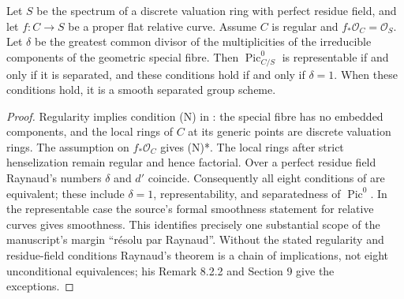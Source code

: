 \begin{theorem}\label{thm:B3-picard}
Let $S$ be the spectrum of a discrete valuation ring with perfect
residue field, and let $f:C\to S$ be a proper flat relative curve.
Assume $C$ is regular and $f_*\mathcal O_C=\mathcal O_S$.
Let $\delta$ be the greatest common divisor of the multiplicities
of the irreducible components of the geometric special fibre.
Then $\operatorname{Pic}^0_{C/S}$ is representable if and only if it
is separated, and these conditions hold if and only if $\delta=1$.
When these conditions hold, it is a smooth separated group scheme.
\end{theorem}
\begin{proof}
Regularity implies condition (N) in
\cite[Definition 6.1.4 and Examples 6.1.6]{BRaynaud1970}: the
special fibre has no embedded components, and the local rings of
$C$ at its generic points are discrete valuation rings.
The assumption on $f_*\mathcal O_C$ gives (N)*.
The local rings after strict henselization remain regular and hence
factorial. Over a perfect residue field Raynaud's numbers $\delta$
and $d'$ coincide. Consequently all eight conditions of
\cite[Theorem 8.2.1, pp.~66--67]{BRaynaud1970} are equivalent;
these include $\delta=1$, representability, and separatedness of
$\operatorname{Pic}^0$. In the representable case the source's
formal smoothness statement for relative curves gives smoothness.
This identifies precisely one substantial scope of the manuscript's
margin ``r\'esolu par Raynaud''. Without the stated regularity and
residue-field conditions Raynaud's theorem is a chain of implications,
not eight unconditional equivalences; his Remark 8.2.2 and Section 9
give the exceptions.
\end{proof}

